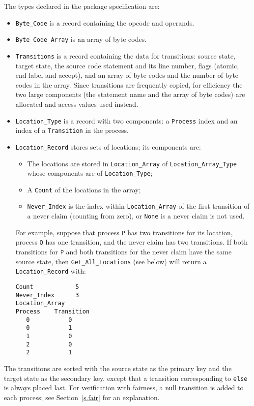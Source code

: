 \documentclass[11pt]{article}
\newcommand*{\p}[1]{\texttt{#1}}
\begin{document}
The types declared in the package specification are:
\begin{itemize}
\item \p{Byte\_Code} is a record containing the opcode and operands.
\item \p{Byte\_Code\_Array} is an array of byte codes.
\item \p{Transitions} is a record containing the data for transitions:
source state, target state, the source code statement and its line
number, flags (atomic, end label and accept), and an array of byte codes
and the number of byte codes in the array.
Since transitions are frequently copied, for efficiency the two large
components (the statement name and the array of byte codes) are
allocated and access values used instead.
\item \p{Location\_Type} is a record with two components: a \p{Process}
index and an index of a \p{Transition} in the process.
\item \p{Location\_Record} stores sets of locations;
its components are:

\begin{itemize}
\item The locations are stored in \p{Location\_Array} of
\p{Location\_Array\_Type} whose components are of \p{Location\_Type};
\item A \p{Count} of the locations in the array;
\item \p{Never\_Index} is the index within \p{Location\_Array} of the
first transition of a never claim (counting from zero), or \p{None} is a
never claim is not used.
\end{itemize}

For example, suppose that process \p{P} has two transitions for its
location, process \p{Q} has one transition, and the never claim has two
transitions. If both transitions for \p{P} and both transitions for the
never claim have the same source state, then \p{Get\_All\_Locations}
(see below) will return a \p{Location\_Record} with:

\begin{verbatim}
Count            5
Never_Index      3
Location_Array
Process    Transition
   0           0
   0           1
   1           0
   2           0
   2           1
\end{verbatim}
\end{itemize}

The transitions are sorted with the source state as the primary key and
the target state as the secondary key, except that a transition
corresponding to \p{else} is always placed last. For verification with
fairness, a null transition is added to each process; see
Section~\ref{s.fair} for an explanation.
\end{document}
